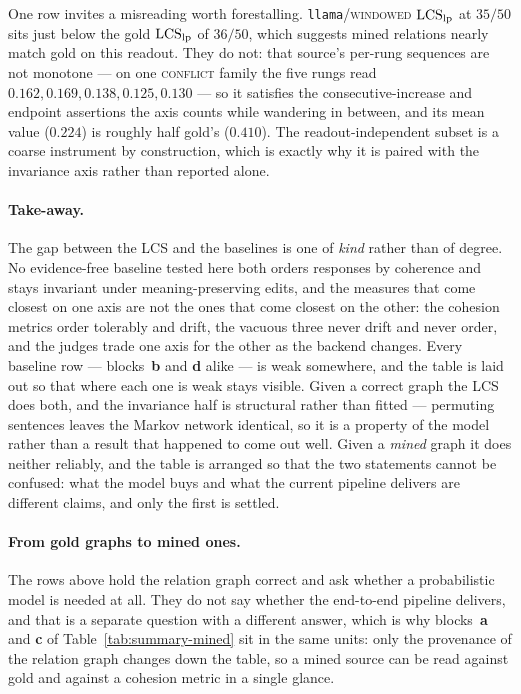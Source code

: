 One row invites a misreading worth forestalling. \texttt{llama}/\textsc{windowed} $\mathrm{LCS}_{\mathrm{lp}}$ at $35/50$ sits
just below the gold $\mathrm{LCS}_{\mathrm{lp}}$ of $36/50$, which suggests mined relations nearly match gold on this readout.
They do not: that source's per-rung sequences are not monotone --- on one \textsc{conflict} family the five
rungs read $0.162, 0.169, 0.138, 0.125, 0.130$ --- so it satisfies the consecutive-increase and endpoint
assertions the axis counts while wandering in between, and its mean value ($0.224$) is roughly half gold's
($0.410$). The readout-independent subset is a coarse instrument by construction, which is exactly why it is
paired with the invariance axis rather than reported alone.

\paragraph{Take-away.} The gap between the LCS and the baselines is one of \emph{kind} rather than of degree.
No evidence-free baseline tested here both orders responses by coherence and stays invariant under
meaning-preserving edits, and the measures that come closest on one axis are not the ones that come closest on
the other: the cohesion metrics order tolerably and drift, the vacuous three never drift and never order, and
the judges trade one axis for the other as the backend changes. Every baseline row --- blocks~\textbf{b}
and \textbf{d} alike --- is weak somewhere, and the table is laid out so that where each one is weak stays
visible. Given
a correct graph the LCS does both, and the invariance half is structural rather than fitted --- permuting
sentences leaves the Markov network identical, so it is a property of the model rather than a result that
happened to come out well. Given a \emph{mined} graph it does neither reliably, and the table is arranged so
that the two statements cannot be confused: what the model buys and what the current pipeline delivers are
different claims, and only the first is settled.

\paragraph{From gold graphs to mined ones.} The rows above hold the relation graph correct and ask whether a
probabilistic model is needed at all. They do not say whether the end-to-end pipeline delivers, and that is a
separate question with a different answer, which is why blocks~\textbf{a} and \textbf{c} of
Table~\ref{tab:summary-mined} sit in the same units: only the provenance of the relation graph changes down
the table, so a mined source can be read against gold and against a cohesion metric in a single glance.


